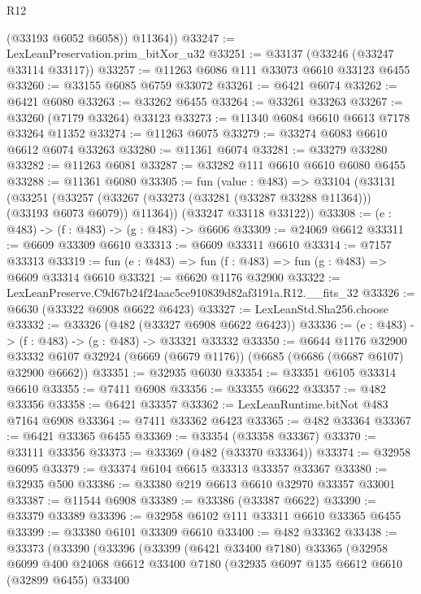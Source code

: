 \begin{lexlean}{R12}
\begin{coremodule}
          (@33193 @6052 @6058))
        @11364))
@33247 := LexLeanPreservation.prim_bitXor_u32
@33251 := @33137 (@33246 (@33247 @33114 @33117))
@33257 := @11263 @6086 @111 @33073 @6610 @33123 @6455
@33260 := @33155 @6085 @6759 @33072
@33261 := @6421 @6074
@33262 := @6421 @6080
@33263 := @33262 @6455
@33264 := @33261 @33263
@33267 := @33260 (@7179 @33264) @33123
@33273 := @11340 @6084 @6610 @6613 @7178 @33264 @11352
@33274 := @11263 @6075
@33279 := @33274 @6083 @6610 @6612 @6074 @33263
@33280 := @11361 @6074
@33281 := @33279 @33280
@33282 := @11263 @6081
@33287 := @33282 @111 @6610 @6610 @6080 @6455
@33288 := @11361 @6080
@33305 := fun (value : @483) =>
  @33104
    (@33131
      (@33251
        (@33257 (@33267 (@33273 (@33281 (@33287 @33288 @11364))) (@33193 @6073 @6079)) @11364))
      (@33247 @33118 @33122))
@33308 := (e : @483) -> (f : @483) -> (g : @483) -> @6606
@33309 := @24069 @6612
@33311 := @6609 @33309 @6610
@33313 := @6609 @33311 @6610
@33314 := @7157 @33313
@33319 := fun (e : @483) => fun (f : @483) => fun (g : @483) => @6609 @33314 @6610
@33321 := @6620 @1176 @32900
@33322 := LexLeanPreserve.C9d67b24f24aac5ce910839d82af3191a.R12.__fits_32
@33326 := @6630 (@33322 @6908 @6622 @6423)
@33327 := LexLeanStd.Sha256.choose
@33332 := @33326 (@482 (@33327 @6908 @6622 @6423))
@33336 := (e : @483) -> (f : @483) -> (g : @483) -> @33321 @33332
@33350 := @6644
    @1176
    @32900
    @33332
    @6107
    @32924
    (@6669 (@6679 @1176))
    (@6685 (@6686 (@6687 @6107) @32900 @6662))
@33351 := @32935 @6030
@33354 := @33351 @6105 @33314 @6610
@33355 := @7411 @6908
@33356 := @33355 @6622
@33357 := @482 @33356
@33358 := @6421 @33357
@33362 := LexLeanRuntime.bitNot @483 @7164 @6908
@33364 := @7411 @33362 @6423
@33365 := @482 @33364
@33367 := @6421 @33365 @6455
@33369 := @33354 (@33358 @33367)
@33370 := @33111 @33356
@33373 := @33369 (@482 (@33370 @33364))
@33374 := @32958 @6095
@33379 := @33374 @6104 @6615 @33313 @33357 @33367
@33380 := @32935 @500
@33386 := @33380 @219 @6613 @6610 @32970 @33357 @33001
@33387 := @11544 @6908
@33389 := @33386 (@33387 @6622)
@33390 := @33379 @33389
@33396 := @32958 @6102 @111 @33311 @6610 @33365 @6455
@33399 := @33380 @6101 @33309 @6610
@33400 := @482 @33362
@33438 := @33373
    (@33390
      (@33396
        (@33399
          (@6421 @33400 @7180)
          @33365
          (@32958
            @6099
            @400
            @24068
            @6612
            @33400
            @7180
            (@32935
              @6097
              @135
              @6612
              @6610
              (@32899 @6455)
              @33400

\end{coremodule}
\end{lexlean}
